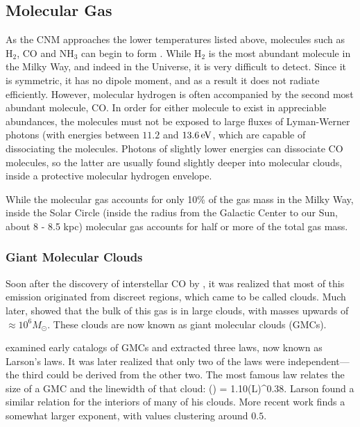 \documentclass[../dissertation.tex]{subfiles}
\begin{document}
\subsection{Molecular Gas} \label{subsec:intro_molecular_gas}
As the CNM approaches the lower temperatures listed above, molecules such as H$_2$, CO and NH$_3$ can begin to form \citep[p. 47]{2009ARA&A..47...27K}. While H$_2$ is the most abundant molecule in the Milky Way, and indeed in the Universe, it is very difficult to detect. Since it is symmetric, it has no dipole moment, and as a result it does not radiate efficiently. However, molecular hydrogen is often accompanied by the second most abundant molecule, CO. In order for either molecule to exist in appreciable abundances, the molecules must not be exposed to large fluxes of Lyman-Werner photons (with energies between $11.2$ and $13.6\,{\rm eV}$, which are capable of dissociating the molecules. Photons of slightly lower energies can dissociate CO molecules, so the latter are usually found slightly deeper into molecular clouds, inside a protective molecular hydrogen envelope.

While the molecular gas accounts for only 10\% of the gas mass in the Milky Way, inside the Solar Circle (inside the radius from the Galactic Center to our Sun, about 8 - 8.5 kpc) 
molecular gas accounts for half or more of the total gas mass. 


\subsubsection{Giant Molecular Clouds}
Soon after the discovery of interstellar CO by \citet{1970ApJ...161L..43W}, it was realized that most of this emission originated from discreet regions, which came to be called clouds. Much later,
\citet{1987ApJ...319..730S}  showed that the bulk of this gas is in large clouds, with masses upwards of $\approx10^6M_\odot$. 
These clouds are now known as giant molecular clouds (GMCs).


\citet{1981MNRAS.194..809L} examined early catalogs of GMCs and extracted three laws, now known as Larson's laws. It was later realized that only two of the laws were independent---the third could be derived from the other two. The most famous law relates the size of a GMC and the linewidth of that cloud:
%
\be
\left({\sigma\over \kms}\right) = 1.10\left({L\over \pc}\right)^{0.38}.
\ee
%
Larson found a similar relation for the interiors of many of his clouds.
More recent work finds a somewhat larger exponent, with values clustering around $0.5$.
\end{document}
